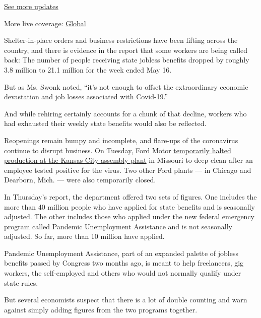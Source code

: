 \href{https://www.nytimes3xbfgragh.onion/live/2020/09/11/business/stock-market-today-coronavirus?action=click\&pgtype=Article\&state=default\&region=MAIN_CONTENT_1\&context=storylines_live_updates}{See
more updates}

More live coverage:
\href{https://www.nytimes3xbfgragh.onion/2020/09/11/world/covid-19-coronavirus.html?action=click\&pgtype=Article\&state=default\&region=MAIN_CONTENT_1\&context=storylines_live_updates}{Global}

Shelter-in-place orders and business restrictions have been lifting
across the country, and there is evidence in the report that some
workers are being called back: The number of people receiving state
jobless benefits dropped by roughly 3.8 million to 21.1 million for the
week ended May 16.

But as Ms. Swonk noted, ``it's not enough to offset the extraordinary
economic devastation and job losses associated with Covid-19.''

And while rehiring certainly accounts for a chunk of that decline,
workers who had exhausted their weekly state benefits would also be
reflected.

Reopenings remain bumpy and incomplete, and flare-ups of the coronavirus
continue to disrupt business. On Tuesday, Ford Motor
\href{https://www.freep.com/story/money/cars/ford/2020/05/26/kansas-city-plant-production-claymoco-ford-worker-postive-covid/5262884002/}{temporarily
halted production at the Kansas City assembly plant} in Missouri to deep
clean after an employee tested positive for the virus. Two other Ford
plants --- in Chicago and Dearborn, Mich. --- were also temporarily
closed.

In Thursday's report, the department offered two sets of figures. One
includes the more than 40 million people who have applied for state
benefits and is seasonally adjusted. The other includes those who
applied under the new federal emergency program called Pandemic
Unemployment Assistance and is not seasonally adjusted. So far, more
than 10 million have applied.

Pandemic Unemployment Assistance, part of an expanded palette of jobless
benefits passed by Congress two months ago, is meant to help
freelancers, gig workers, the self-employed and others who would not
normally qualify under state rules.

But several economists suspect that there is a lot of double counting
and warn against simply adding figures from the two programs together.

